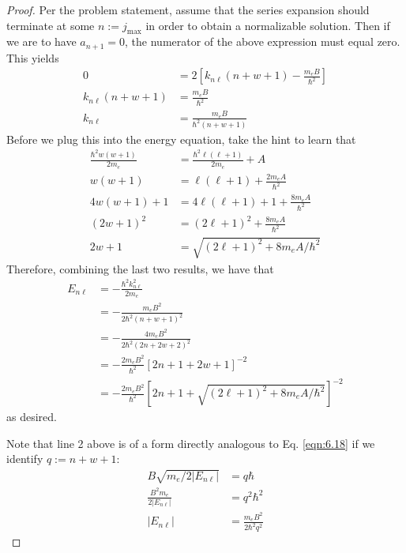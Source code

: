 \documentclass[../psets.tex]{subfiles}
\begin{document}
\begin{enumerate}
\begin{enumerate}
\begin{proof}
            Per the problem statement, assume that the series expansion should terminate at some $n:=j_\text{max}$ in order to obtain a normalizable solution. Then if we are to have $a_{n+1}=0$, the numerator of the above expression must equal zero. This yields
            \begin{align*}
                0 &= 2\left[ k_{n\ell}(n+w+1)-\frac{m_eB}{\hbar^2} \right]\\
                k_{n\ell}(n+w+1) &= \frac{m_eB}{\hbar^2}\\
                k_{n\ell} &= \frac{m_eB}{\hbar^2(n+w+1)}
            \end{align*}
            Before we plug this into the energy equation, take the hint to learn that
            \begin{align*}
                \frac{\hbar^2w(w+1)}{2m_e} &= \frac{\hbar^2\ell(\ell+1)}{2m_e}+A\\
                w(w+1) &= \ell(\ell+1)+\frac{2m_eA}{\hbar^2}\\
                4w(w+1)+1 &= 4\ell(\ell+1)+1+\frac{8m_eA}{\hbar^2}\\
                (2w+1)^2 &= (2\ell+1)^2+\frac{8m_eA}{\hbar^2}\\
                2w+1 &= \sqrt{(2\ell+1)^2+8m_eA/\hbar^2}
            \end{align*}
            Therefore, combining the last two results, we have that
            \begin{align*}
                E_{n\ell} &= -\frac{\hbar^2k_{n\ell}^2}{2m_e}\\
                &= -\frac{m_eB^2}{2\hbar^2(n+w+1)^2}\\
                &= -\frac{4m_eB^2}{2\hbar^2(2n+2w+2)^2}\\
                &= -\frac{2m_eB^2}{\hbar^2}\left[ 2n+1+2w+1 \right]^{-2}\\
                &= -\frac{2m_eB^2}{\hbar^2}\left[ 2n+1+\sqrt{(2\ell+1)^2+8m_eA/\hbar^2} \right]^{-2}
            \end{align*}
            as desired.\par
            Note that line 2 above is of a form directly analogous to Eq. \ref{eqn:6.18} if we identify $q:=n+w+1$:
            \begin{align*}
                B\sqrt{m_e/2|E_{n\ell}|} &= q\hbar\\
                \frac{B^2m_e}{2|E_{n\ell}|} &= q^2\hbar^2\\
                |E_{n\ell}| &= \frac{m_eB^2}{2\hbar^2q^2}
            \end{align*}

\end{proof}
\end{enumerate}
\end{enumerate}
\end{document}

